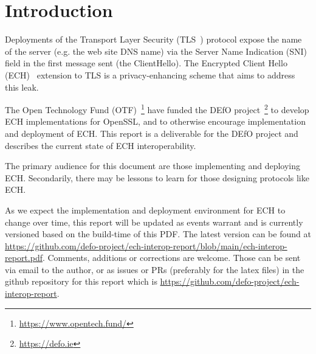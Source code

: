 \section{Introduction}

Deployments of the Transport Layer Security (TLS~\cite{rfc8446}) protocol
expose the name of the server (e.g. the web site DNS name) via the Server Name
Indication (SNI) field in the first message sent (the ClientHello).  The
Encrypted Client Hello (ECH)~\cite{draft-ietf-tls-esni} extension to TLS is a
privacy-enhancing scheme that aims to address this leak.

The Open Technology Fund (OTF)~\footnote{\url{https://www.opentech.fund/}} have
funded the DEfO project~\footnote{\url{https://defo.ie}} to develop 
ECH implementations for OpenSSL, and to otherwise encourage implementation
and deployment of ECH.  This report is a deliverable for the DEfO project
and describes the current state of ECH interoperability.

The primary audience for this document are those implementing and
deploying ECH. Secondarily, there may be lessons to learn for those
designing protocols like ECH.

As we expect the implementation and deployment environment for ECH to change
over time, this report will be updated as events warrant and is currently
versioned based on the build-time of this PDF. The latest version can be found
at
\url{https://github.com/defo-project/ech-interop-report/blob/main/ech-interop-report.pdf}.
Comments, additions or corrections are welcome. Those can be sent via email to
the author, or as issues or PRs (preferably for the latex files) in the github
repository for this report which is
\url{https://github.com/defo-project/ech-interop-report}.
